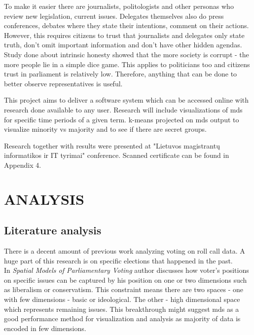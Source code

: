 \documentclass[a4paper,12pt]{article}
\begin{document}
	To make it easier there are journalists, politologists and other personas who review new legislation, current issues. Delegates themselves also do press conferences, debates where they state their intentions, comment on their actions. However, this requires citizens to trust that journalists and delegates only state truth, don't omit important information and don't have other hidden agendas. Study done about intrinsic honesty showed that the more society is corrupt - the more people lie in a simple dice game. This applies to politicians too and citizens trust in parliament is relatively low.  Therefore, anything that can be done to better observe representatives is useful.
	
	This project aims to deliver a software system which can be accessed online with research done available to any user. Research will include visualizations of \acrfull{mds} for specific time periods of a given term. \Gls{k-means} projected on \gls{mds} output to visualize minority vs majority and to see if there are secret groups.
	
	Research together with results were presented at "Lietuvos magistrantų informatikos ir IT tyrimai" conference. Scanned certificate can be found in Appendix 4.
	
	\clearpage
	
	\section{ANALYSIS}
	
	\subsection{Literature analysis}
	
	There is a decent amount of previous work analyzing voting on roll call data. A huge part of this research is on specific elections that happened in the past.\\	
	
	In \textit{Spatial Models of Parliamentary Voting} \cite{poole_2005} author discusses how voter's positions on specific issues can be captured by his position on one or two dimensions such as liberalism or conservatism. This constraint means there are two spaces - one with few dimensions - basic  or ideological. The other - high dimensional space which represents remaining issues. This breakthrough might suggest \acrlong{mds} as a good performance method for visualization and analysis as majority of data is encoded in few dimensions.\\
	
\end{document}
